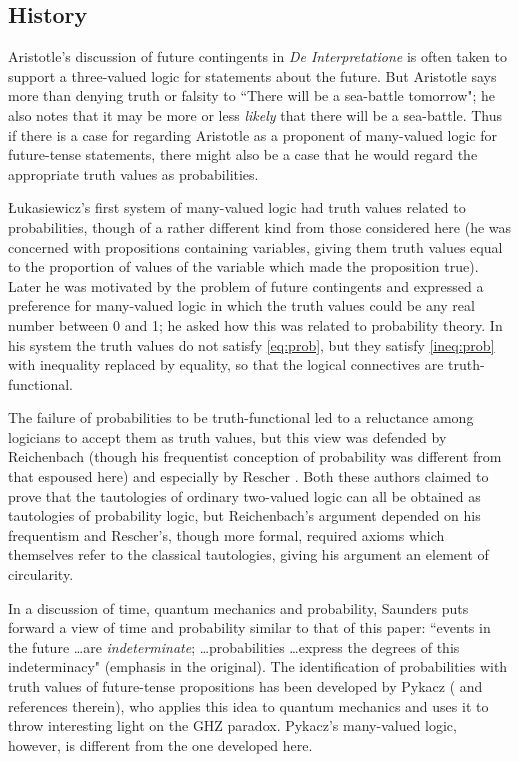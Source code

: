 \documentclass[12pt,reqno]{article}
\renewcommand{\(}{\left(}
\renewcommand{\)}{\right)}
\newcommand{\<}{\langle}
\renewcommand{\>}{\rangle}
\theoremstyle{plain} %
\begin{document}
\subsection{History}
\label{subsec:history}

Aristotle's discussion of future contingents in \emph{De Interpretatione} is often taken to support a three-valued logic for statements about the future. But Aristotle says more than denying truth or falsity to ``There will be a sea-battle tomorrow"; he also notes that it may be more or less \emph{likely} that there will be a sea-battle. Thus if there is a case for regarding Aristotle as a proponent of many-valued logic for future-tense statements, there might also be a case that he would regard the appropriate truth values as probabilities.

\L ukasiewicz's first system of many-valued logic \cite{Luk:prob} had truth values related to probabilities, though of a rather different kind from those considered here (he was concerned with propositions containing variables, giving them truth values equal to the proportion of values of the variable which made the proposition true). Later \cite{Luk:indeterminism} he was motivated by the problem of future contingents and expressed a preference for many-valued logic in which the truth values could be any real number between 0 and 1; he asked how this was related to probability theory. In his system the truth values do not satisfy \eqref{eq:prob}, but they satisfy \eqref{ineq:prob} with inequality replaced by equality, so that the logical connectives are truth-functional. 

The failure of probabilities to be truth-functional led to a reluctance among logicians to accept them as truth values, but this view was defended by Reichenbach \cite{Reichenbach:probty} (though his frequentist conception of probability was different from that espoused here) and especially by Rescher \cite {Rescher:manyval}. Both these authors claimed to prove that the tautologies of ordinary two-valued logic can all be obtained as tautologies of probability logic, but Reichenbach's argument depended on his frequentism and Rescher's, though more formal, required axioms which themselves refer to the classical tautologies, giving his argument an element of circularity.

In a discussion of time, quantum mechanics and probability, Saunders \cite{Saunders:Synthese3} puts forward a view of time and probability similar to that of this paper: ``events in the future \ldots are \emph{indeterminate}; \ldots probabilities \ldots express the degrees of this indeterminacy" (emphasis in the original). The identification of probabilities with truth values of future-tense propositions has been developed  by Pykacz (\cite{Pykacz} and references therein), who applies this idea to quantum mechanics and uses it to throw interesting light on the GHZ paradox. Pykacz's many-valued logic, however, is different from the one developed here. 
\end{document}
